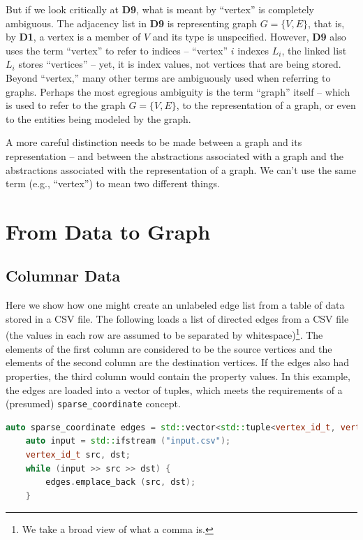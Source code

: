 But if we look critically at \textbf{D9}, what is meant by ``vertex'' is completely ambiguous.  The adjacency list
in \textbf{D9} is representing graph $G=\{ V, E\}$, that is, by \textbf{D1}, a vertex is a member of $V$ and its type is
unspecified.  However, \textbf{D9} also uses the term ``vertex'' to refer to indices -- ``vertex'' $i$ indexes $L_i$, the linked list   
$L_i$ stores ``vertices'' -- yet, it is index values, not vertices that are being stored.  Beyond ``vertex,'' many other terms are
 ambiguously used when referring to graphs.  Perhaps the most egregious ambiguity is the term ``graph'' itself -- which is used to 
refer to the graph $G=\{ V, E \}$, to the representation of a graph, or even to the entities being modeled by the graph.

A more careful distinction needs to be made between a graph and its representation -- and between the abstractions associated with
a graph and the abstractions associated with the representation of a graph.  We can't use the same term (e.g., ``vertex'') to mean
two different things.


\section{From Data to Graph}

\subsection{Columnar Data}
Here we show how one might create an unlabeled edge list from a table of data stored in a CSV file.  The following loads a list of directed edges from a CSV file (the values in each row are assumed to be separated by whitespace)\footnote{We take a broad view of what a comma is.}.
The elements of the first column are considered to be the source vertices and the elements of
the second column are the destination vertices. If the edges also had properties, the third column
would contain the property values.  In this example, the edges are loaded into a vector of tuples, which meets the requirements of a (presumed) \lstinline{sparse_coordinate} concept.
\begin{lstlisting}[language=C++]
    auto sparse_coordinate edges = std::vector<std::tuple<vertex_id_t, vertex_id_t>;
    auto input = std::ifstream ("input.csv");
    vertex_id_t src, dst;
    while (input >> src >> dst) {
        edges.emplace_back (src, dst);
    }
\end{lstlisting}

